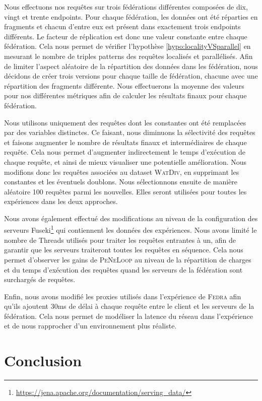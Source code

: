 \documentclass[a4paper]{article}
\def\fedra{\textsc{Fedra}\xspace}
\def\peneloop{\textsc{PeNeLoop}\xspace}
\begin{document}
Nous effectuons nos requêtes sur trois fédérations différentes composées de dix, vingt et trente endpoints. Pour chaque fédération, les données ont été réparties en fragments et chacun d'entre eux est présent dans exactement trois endpoints différents. Le facteur de réplication est donc une valeur constante entre chaque fédération. Cela nous permet de vérifier l'hypothèse \ref{hypo:localityVSparallel} en mesurant le nombre de triples patterns des requêtes localisés et parallélisés. Afin de limiter l'aspect aléatoire de la répartition des données dans les fédération, nous décidons de créer trois versions pour chaque taille de fédération, chacune avec une répartition des fragments différente. Nous effectuerons la moyenne des valeurs pour nos différentes métriques afin de calculer les résultats finaux pour chaque fédération.

Nous utilisons uniquement des requêtes dont les constantes ont été remplacées par des variables distinctes. Ce faisant, nous diminuons la sélectivité des requêtes et faisons augmenter le nombre de résultats finaux et intermédiaires de chaque requête. Cela nous permet d'augmenter indirectement le temps d'exécution de chaque requête, et ainsi de mieux visualiser une potentielle amélioration. Nous modifions donc les requêtes associées au dataset \textsc{WatDiv}, en supprimant les constantes et les éventuels doublons. Nous sélectionnons ensuite de manière aléatoire 100 requêtes parmi les nouvelles. Elles seront utilisées pour toutes les expériences dans les deux approches.

Nous avons également effectué des modifications au niveau de la configuration des serveurs Fuseki\footnote{\url{https://jena.apache.org/documentation/serving_data/}} qui contiennent les données des expériences. Nous avons limité le nombre de Threads utilisés pour traiter les requêtes entrantes à un, afin de garantir que les serveurs traiteront toutes les requêtes en séquence. Cela nous permet d'observer les gains de \peneloop au niveau de la répartition de charges et du temps d'exécution des requêtes quand les serveurs de la fédération sont surchargés de requêtes.

Enfin, nous avons modifié les proxies utilisés dans l'expérience de \fedra afin qu'ils ajoutent 30ms de délai à chaque requête entre le client et les serveurs de la fédération. Cela nous permet de modéliser la latence du réseau dans l'expérience et de nous rapprocher d'un environnement plus réaliste.

\section{Conclusion}
\end{document}
